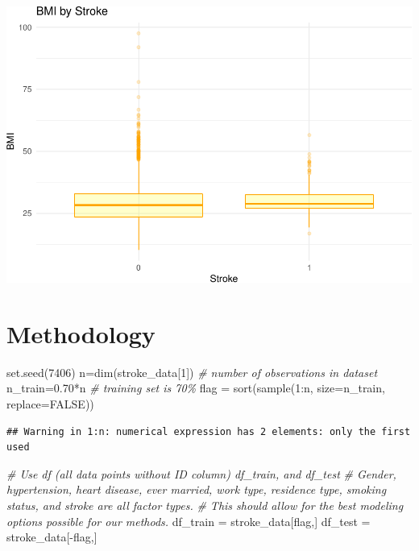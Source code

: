 \documentclass[
]{article}
\newenvironment{Shaded}{\begin{snugshade}}{\end{snugshade}}
\newcommand{\AttributeTok}[1]{\textcolor[rgb]{0.77,0.63,0.00}{#1}}
\newcommand{\CommentTok}[1]{\textcolor[rgb]{0.56,0.35,0.01}{\textit{#1}}}
\newcommand{\ConstantTok}[1]{\textcolor[rgb]{0.00,0.00,0.00}{#1}}
\newcommand{\DecValTok}[1]{\textcolor[rgb]{0.00,0.00,0.81}{#1}}
\newcommand{\FloatTok}[1]{\textcolor[rgb]{0.00,0.00,0.81}{#1}}
\newcommand{\FunctionTok}[1]{\textcolor[rgb]{0.00,0.00,0.00}{#1}}
\newcommand{\NormalTok}[1]{#1}
\newcommand{\OtherTok}[1]{\textcolor[rgb]{0.56,0.35,0.01}{#1}}
\newcommand{\SpecialCharTok}[1]{\textcolor[rgb]{0.00,0.00,0.00}{#1}}
\renewcommand{\=}[1]{\stackrel{#1}{=}}
\theoremstyle{definition}
\theoremstyle{remark}
\begin{document}
\includegraphics{sioux_mach_learn_project_files/figure-latex/unnamed-chunk-19-1.pdf}

\hypertarget{methodology}{%
\section{Methodology}\label{methodology}}

\begin{Shaded}
\begin{Highlighting}[]
\FunctionTok{set.seed}\NormalTok{(}\DecValTok{7406}\NormalTok{)}
\NormalTok{n}\OtherTok{=}\FunctionTok{dim}\NormalTok{(stroke\_data[}\DecValTok{1}\NormalTok{])  }\CommentTok{\# number of observations in dataset}
\NormalTok{n\_train}\OtherTok{=}\FloatTok{0.70}\SpecialCharTok{*}\NormalTok{n  }\CommentTok{\# training set is 70\%}
\NormalTok{flag }\OtherTok{=} \FunctionTok{sort}\NormalTok{(}\FunctionTok{sample}\NormalTok{(}\DecValTok{1}\SpecialCharTok{:}\NormalTok{n, }\AttributeTok{size=}\NormalTok{n\_train, }\AttributeTok{replace=}\ConstantTok{FALSE}\NormalTok{))}
\end{Highlighting}
\end{Shaded}

\begin{verbatim}
## Warning in 1:n: numerical expression has 2 elements: only the first used
\end{verbatim}

\begin{Shaded}
\begin{Highlighting}[]
\CommentTok{\# Use df (all data points without ID column) df\_train, and df\_test}
\CommentTok{\# Gender, hypertension, heart disease, ever married, work type, residence type, smoking status, and stroke are all factor types.}
\CommentTok{\# This should allow for the best modeling options possible for our methods.}
\NormalTok{df\_train }\OtherTok{=}\NormalTok{ stroke\_data[flag,]}
\NormalTok{df\_test }\OtherTok{=}\NormalTok{ stroke\_data[}\SpecialCharTok{{-}}\NormalTok{flag,]}
\end{Highlighting}
\end{Shaded}
\end{document}
